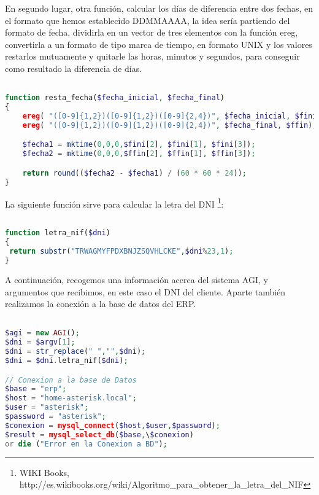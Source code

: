 En segundo lugar, otra función, calcular los días de diferencia entre dos fechas, en el formato que hemos establecido DDMMAAAA, la idea sería partiendo del formato de fecha, dividirla en un vector de tres elementos con la función ereg, convertirla a un formato de tipo marca de tiempo, en formato UNIX y los valores restarlos mutuamente y quitarle las horas, minutos y segundos, para conseguir como resultado la diferencia de días.

\begin{lstlisting}[language=php,title={/var/lib/asterisk/agi-bin/fingarantia.php}]

function resta_fecha($fecha_inicial, $fecha_final)
{
    ereg( "([0-9]{1,2})([0-9]{1,2})([0-9]{2,4})", $fecha_inicial, $fini);
    ereg( "([0-9]{1,2})([0-9]{1,2})([0-9]{2,4})", $fecha_final, $ffin);

    $fecha1 = mktime(0,0,0,$fini[2], $fini[1], $fini[3]);
    $fecha2 = mktime(0,0,0,$ffin[2], $ffin[1], $ffin[3]);

    return round(($fecha2 - $fecha1) / (60 * 60 * 24));
}

\end{lstlisting}

La siguiente función sirve para calcular la letra del DNI \footnote{WIKI Books, http://es.wikibooks.org/wiki/Algoritmo\_para\_obtener\_la\_letra\_del\_NIF}:

\begin{lstlisting}[language=php,title={/var/lib/asterisk/agi-bin/fingarantia.php}]

function letra_nif($dni)
{
 return substr("TRWAGMYFPDXBNJZSQVHLCKE",$dni%23,1);
}

\end{lstlisting}

A continuación, recogemos una información acerca del sistema AGI, y argumentos que recibimos, en este caso el DNI del cliente. Aparte también realizamos la conexión a la base de datos del ERP.

\begin{lstlisting}[language=php,title={/var/lib/asterisk/agi-bin/fingarantia.php}]

$agi = new AGI();
$dni = $argv[1];
$dni = str_replace(" ","",$dni);
$dni = $dni.letra_nif($dni);

// Conexion a la base de Datos
$base = "erp";
$host = "home-asterisk.local";
$user = "asterisk";
$password = "asterisk";
$conexion = mysql_connect($host,$user,$password);
$result = mysql_select_db($base,\$conexion) 
or die ("Error en la Conexion a BD");

\end{lstlisting}


